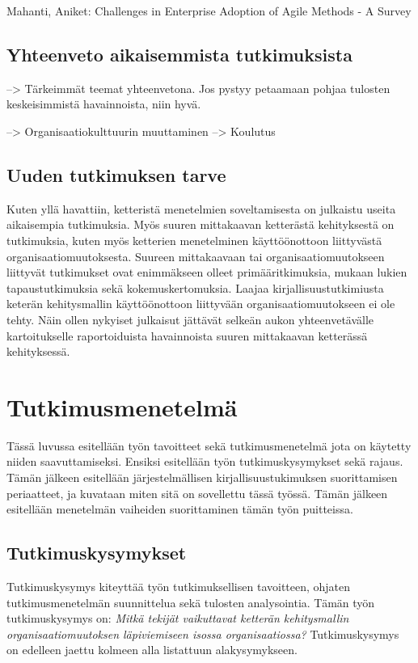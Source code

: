 Mahanti, Aniket: Challenges in Enterprise Adoption of Agile Methods - A Survey

\subsection{Yhteenveto aikaisemmista tutkimuksista}

--> Tärkeimmät teemat yhteenvetona. Jos pystyy petaamaan pohjaa tulosten
keskeisimmistä havainnoista, niin hyvä.

--> Organisaatiokulttuurin muuttaminen \newline
--> Koulutus

\subsection{Uuden tutkimuksen tarve}
Kuten yllä havattiin, ketteristä menetelmien soveltamisesta on julkaistu useita
aikaisempia tutkimuksia. Myös suuren mittakaavan ketterästä kehityksestä on
tutkimuksia, kuten myös ketterien menetelminen käyttöönottoon liittyvästä
organisaatiomuutoksesta. Suureen mittakaavaan tai organisaatiomuutokseen
liittyvät tutkimukset ovat enimmäkseen olleet primääritkimuksia, mukaan lukien
tapaustutkimuksia sekä kokemuskertomuksia. Laajaa kirjallisuustutkimiusta
keterän kehitysmallin käyttöönottoon liittyvään organisaatiomuutokseen ei ole
tehty. Näin ollen nykyiset julkaisut jättävät selkeän aukon yhteenvetävälle
kartoitukselle raportoiduista havainnoista suuren mittakaavan ketterässä
kehityksessä.


\section{Tutkimusmenetelmä}
\label{sec:menetelma}

Tässä luvussa esitellään työn tavoitteet sekä tutkimusmenetelmä jota on käytetty
niiden saavuttamiseksi. Ensiksi esitellään työn tutkimuskysymykset sekä rajaus.
Tämän jälkeen esitellään järjestelmällisen kirjallisuustukimuksen suorittamisen
periaatteet, ja kuvataan miten sitä on sovellettu tässä työssä. Tämän jälkeen
esitellään menetelmän vaiheiden suorittaminen tämän työn puitteissa.

\subsection{Tutkimuskysymykset}
Tutkimuskysymys kiteyttää työn tutkimuksellisen tavoitteen, ohjaten
tutkimusmenetelmän suunnittelua sekä tulosten analysointia. Tämän työn
tutkimuskysymys on: \textit{Mitkä tekijät vaikuttavat ketterän kehitysmallin
organisaatiomuutoksen läpiviemiseen isossa organisaatiossa?} Tutkimuskysymys on
edelleen jaettu kolmeen alla listattuun alakysymykseen.

